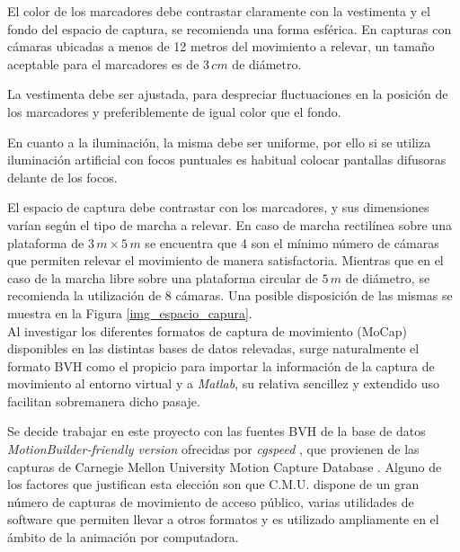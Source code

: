 El color de los  marcadores debe contrastar claramente con la vestimenta y el fondo del espacio de captura, se recomienda una forma esférica. En capturas con cámaras ubicadas a menos de 12 metros del movimiento a relevar, un tamaño aceptable para el marcadores es de $3\,cm$ de diámetro.

La vestimenta debe ser ajustada, para despreciar fluctuaciones en la posición de los marcadores y preferiblemente de igual color que el fondo.  

En cuanto a la iluminación, la misma debe ser uniforme, por ello si se utiliza iluminación artificial con focos puntuales es habitual colocar pantallas difusoras delante de los focos.

El espacio de captura debe contrastar con los marcadores, y sus dimensiones varían según el tipo de marcha a relevar. En caso de marcha rectilínea sobre una plataforma de $3\,m \times 5 \,m$ se encuentra que 4 son el mínimo número de cámaras que permiten relevar el movimiento de manera satisfactoria. Mientras  que en el caso de la marcha libre sobre una plataforma circular de $5\,m$ de diámetro, se recomienda la utilización de 8 cámaras. Una posible disposición de las mismas se muestra en la Figura \ref{img_espacio_capura}. \\

Al investigar los diferentes formatos de captura de movimiento (MoCap) disponibles en las distintas bases de datos relevadas, surge naturalmente el formato BVH como el propicio para importar la información de la captura de movimiento al entorno virtual y a \textit{Matlab}, su relativa sencillez y extendido uso facilitan sobremanera dicho pasaje. 

Se decide trabajar en este proyecto con las fuentes BVH de la base de datos \textit{MotionBuilder-friendly version} ofrecidas por \textit{cgspeed} \cite{cgspeed}, 
 que provienen de las capturas de Carnegie Mellon University Motion Capture Database \cite{CMU}.
 Alguno de los factores que justifican esta elección son que C.M.U. dispone de un gran número de capturas de movimiento de acceso público, varias utilidades de software que permiten llevar a otros formatos y es utilizado ampliamente en el ámbito de la animación por computadora.
 
